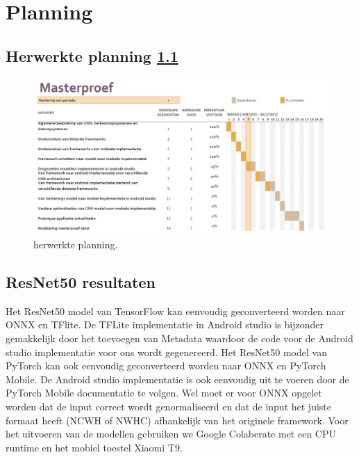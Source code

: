\chapter{Planning}
\section{Herwerkte planning \ref{fig:plan}}
\begin{figure}[!ht]
	\centering
	\includegraphics[width=1.0\linewidth]{fig/planning.jpg}
	\caption{herwerkte planning.}
	\label{fig:plan}
\end{figure}
\section{ResNet50 resultaten}
Het ResNet50 model van TensorFlow kan eenvoudig geconverteerd worden naar ONNX en TFlite.
De TFLite implementatie in Android studio is bijzonder gemakkelijk door het toevoegen van Metadata waardoor de code voor de Android studio implementatie voor ons wordt gegenereerd.
Het ResNet50 model van PyTorch kan ook eenvoudig geconverteerd worden naar ONNX en PyTorch Mobile.
De Android studio implementatie is ook eenvoudig uit te voeren door de PyTorch Mobile documentatie te volgen.
Wel moet er voor ONNX opgelet worden dat de input correct wordt genormaliseerd en dat de input het juiste formaat heeft (NCWH of NWHC) afhankelijk van het originele framework.
Voor het uitvoeren van de modellen gebruiken we Google Colaberate met een CPU runtime en het mobiel toestel Xiaomi T9.


